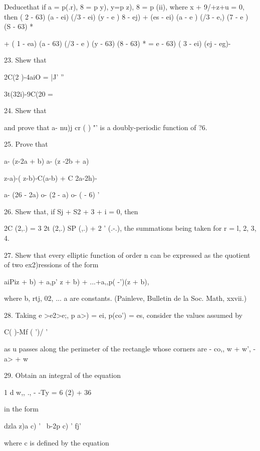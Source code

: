 {%
%

Deducethat if a = p(.r), 8 = p y), y=p z), 8 = p (ii), where x +
9/+z+u = 0, then ( 2 - 63) (a - ei) (/3 - ei) (y - e ) 8 - ej) + (es -
ei) (a - e ) (/3 - e,) (7 - e ) (S - 63) *

+ ( 1 - ea) (a - 63) (/3 - e ) (y - 63) (8 - 63) * = e - 63) ( 3 - ei)
(ej - eg)-

23. Shew that

2C(2 )-4aiO = |J' ''

3t(32i)-9C(20 =


24. Shew that

and prove that a- nu)j cr ( ) "' is a doubly-periodic function of ?6.


25. Prove that

a- (z-2a + b) a- (z -2b + a)

  z-a)-( z-b)-C(a-b) + C 2a-2h)-

a- (26 - 2a) o- (2 - a) o- ( - 6) '


26. Shew that, if Sj + S2 + 3 + i = 0, then

 2C (2,.) = 3 2t (2,.) SP (,.) + 2 ' (.-.), the summations being
taken for r = l, 2, 3, 4. 

27. Shew that every elliptic function of order n can be expressed as
the quotient of two ex2)ressions of the form

aiPiz + b) + a,p' z + b) + ...+a,,p( -')(z + b),

where b, rtj, 02, ... a are constants. (Painleve, Bulletin de la Soc.
Math, xxvii.)

28. Taking e >e2>e;, p a>) = ei, p(co') = es, consider the values
assumed by

C( )-Mf ( ')/ '

as u passes along the perimeter of the rectangle whose corners are -
co,, w + w', -a> + w


29. Obtain an integral of the equation

1 d w,, ., - -Ty = 6 (2) + 36

in the form

dzla z)a c) ' \ b-2p c) ' fj'

where c is defined by the equation

}
